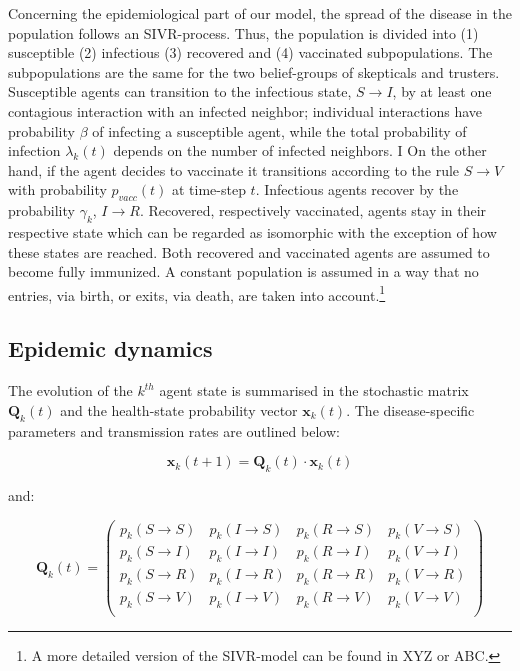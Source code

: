 \documentclass[11pt]{article}
\begin{document}
Concerning the epidemiological part of our model, the spread of the disease in the population follows an SIVR-process. Thus, the population is divided into (1) susceptible (2) infectious (3) recovered and (4) vaccinated subpopulations. The subpopulations are the same for the two belief-groups of skepticals and trusters. Susceptible agents can transition to the infectious state, \(S \rightarrow{} I \), by at least one contagious interaction with an infected neighbor; individual interactions have probability \(\beta\) of infecting a susceptible agent, while the total probability of infection \(\lambda_{k}(t)\) depends on the number of infected neighbors. I On the other hand, if the agent decides to vaccinate it transitions according to the rule \(S \rightarrow{} V \) with probability \(p_{vacc}(t)\) at time-step \(t\). Infectious agents recover by the probability \(\gamma_{k}\), \(I \rightarrow{} R\). Recovered, respectively vaccinated, agents stay in their respective state which can be regarded as isomorphic with the exception of how these states are reached. Both recovered and vaccinated agents are assumed to become fully immunized. A constant population is assumed in a way that no entries, via birth, or exits, via death, are taken into account.\footnote{A more detailed version of the SIVR-model can be found in XYZ or ABC.}

\subsection{Epidemic dynamics}

The evolution of the $\mathit{k}^{th}$ agent state is summarised in the stochastic matrix \(\mathbf{Q}_k(t)\) and the health-state probability vector \(\mathbf{x}_k(t)\). The disease-specific parameters and transmission rates are outlined below:

\begin{equation}\label{eq:1}
	 \mathbf{x}_k(t+1) = \mathbf{Q}_k(t) \cdot \mathbf{x}_k(t)
\end{equation}

and:

\begin{equation}\label{eq:2}
	 \mathbf{Q}_k(t) = 
	 \left (\begin{array}{cccc} p_{k}(S\rightarrow{}S)&p_{k}(I\rightarrow{}S)&p_{k}(R\rightarrow{}S)&p_{k}(V\rightarrow{}S) \\
	 	p_{k}(S\rightarrow{}I)&p_{k}(I\rightarrow{}I)&p_{k}(R\rightarrow{}I)&p_{k}(V\rightarrow{}I) \\
		p_{k}(S\rightarrow{}R)&p_{k}(I\rightarrow{}R)&p_{k}(R\rightarrow{}R)&p_{k}(V\rightarrow{}R) \\
		p_{k}(S\rightarrow{}V)&p_{k}(I\rightarrow{}V)&p_{k}(R\rightarrow{}V)&p_{k}(V\rightarrow{}V) \\
	  \end{array} \right)
\end{equation}
\end{document}
